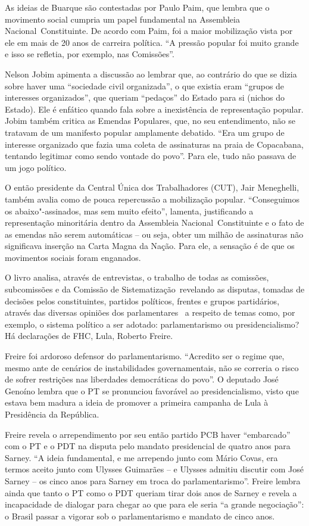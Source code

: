 As ideias de Buarque são contestadas por Paulo Paim, que lembra que o
movimento social cumpria um papel fundamental na Assembleia
Nacional~Constituinte. De acordo com Paim, foi a maior mobilização vista
por ele em mais de 20 anos de carreira política. ``A pressão popular foi
muito grande e isso se refletia, por exemplo, nas Comissões''.

Nelson Jobim apimenta a discussão ao lembrar que, ao contrário do que se
dizia sobre haver uma ``sociedade civil organizada'', o que existia eram
``grupos de interesses organizados'', que queriam ``pedaços'' do Estado
para si (nichos do Estado). Ele é enfático quando fala sobre a
inexistência de representação popular. Jobim também critica as Emendas
Populares, que, no seu entendimento, não se tratavam de um manifesto
popular amplamente debatido. ``Era um grupo de interesse organizado que
fazia uma coleta de assinaturas na praia de Copacabana, tentando
legitimar como sendo vontade do povo''. Para ele, tudo não passava de um
jogo político.

O então presidente da Central Única dos Trabalhadores (CUT), Jair
Meneghelli, também avalia como de pouca repercussão a mobilização
popular. ``Conseguimos os abaixo"-assinados, mas sem muito efeito'',
lamenta, justificando a representação minoritária dentro da Assembleia
Nacional~Constituinte e o fato de as emendas não serem automáticas -- ou
seja, obter um milhão de assinaturas não significava inserção na Carta
Magna da Nação. Para ele, a sensação é de que os movimentos sociais
foram enganados.

O livro analisa, através de entrevistas, o trabalho de todas as
comissões, subcomissões e da Comissão de Sistematização~revelando as
disputas, tomadas de decisões pelos constituintes, partidos políticos,
frentes e grupos partidários, através das diversas opiniões dos
parlamentares~ a respeito de temas como, por exemplo, o sistema político
a ser adotado: parlamentarismo ou presidencialismo? Há declarações de
FHC, Lula, Roberto Freire.

Freire foi ardoroso defensor do parlamentarismo. ``Acredito ser o regime
que, mesmo ante de cenários de instabilidades governamentais, não se
correria o risco de sofrer restrições nas liberdades democráticas do
povo''. O deputado José Genoíno lembra que o PT se pronunciou favorável
ao presidencialismo, visto que estava bem madura a ideia de promover a
primeira campanha de Lula à Presidência da República.

Freire revela o arrependimento por seu então partido PCB haver
``embarcado'' com o PT e o PDT na disputa pelo mandato presidencial de
quatro anos para Sarney. ``A ideia fundamental, e me arrependo junto com
Mário Covas, era termos aceito junto com Ulysses Guimarães -- e Ulysses
admitiu discutir com José Sarney -- os cinco anos para Sarney em troca
do parlamentarismo''. Freire lembra ainda que tanto o PT como o PDT
queriam tirar dois anos de Sarney e revela a incapacidade de dialogar
para chegar ao que para ele seria ``a grande negociação'': o Brasil
passar a vigorar sob o parlamentarismo e mandato de cinco anos.

